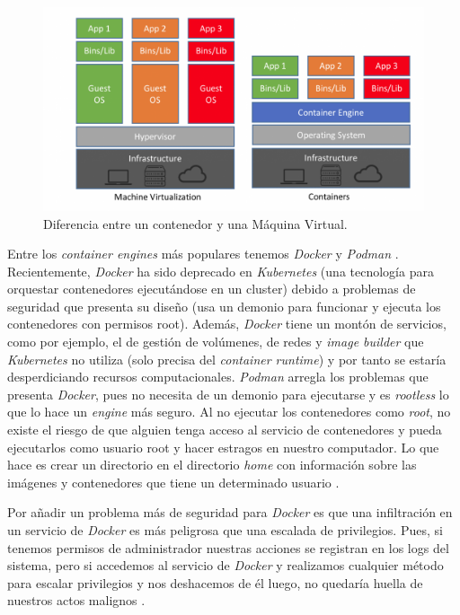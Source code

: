 \begin{figure}[H]
	\includegraphics[scale=0.3]{imagenes/03_Estado_del_arte/containers.png}
	\centering
	\caption{Diferencia entre un contenedor y una Máquina Virtual.}
\end{figure}

Entre los \textit{container engines} más populares tenemos \textit{Docker} \cite{docker} y \textit{Podman} \cite{podman}. Recientemente, \textit{Docker} ha sido deprecado en \textit{Kubernetes} (una tecnología para orquestar contenedores ejecutándose en un cluster) debido a problemas de seguridad que presenta su diseño (usa un demonio para funcionar y ejecuta los contenedores con permisos root). Además, \textit{Docker} tiene un montón de servicios, como por ejemplo, el de gestión de volúmenes, de redes y \textit{image builder} que \textit{Kubernetes} no utiliza (solo precisa del \textit{container runtime}) y por tanto se estaría desperdiciando recursos computacionales. \textit{Podman} arregla los problemas que presenta \textit{Docker}, pues no necesita de un demonio para ejecutarse y es \textit{rootless} lo que lo hace un \textit{engine} más seguro. Al no ejecutar los contenedores como \textit{root}, no existe el riesgo de que alguien tenga acceso al servicio de contenedores y pueda ejecutarlos como usuario root y hacer estragos en nuestro computador. Lo que hace es crear un directorio en el directorio \textit{home} con información sobre las imágenes y contenedores que tiene un determinado usuario \cite{podmanvsdocker}.\newline

Por añadir un problema más de seguridad para \textit{Docker} es que una infiltración en un servicio de \textit{Docker} es más peligrosa que una escalada de privilegios. Pues, si tenemos permisos de administrador nuestras acciones se registran en los logs del sistema, pero si accedemos al servicio de \textit{Docker} y realizamos cualquier método para escalar privilegios y nos deshacemos de él luego, no quedaría huella de nuestros actos malignos \cite{podmanvsdocker}.

